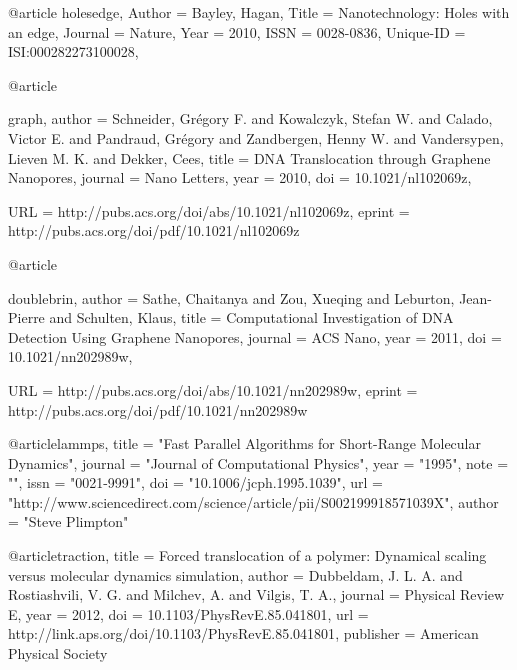 @article{ holesedge,
Author = {Bayley, Hagan},
Title = {{Nanotechnology: Holes with an edge}},
Journal = {{Nature}},
Year = {{2010}},
ISSN = {{0028-0836}},
Unique-ID = {{ISI:000282273100028}},
}

@article{graph,
author = {Schneider, Grégory F. and Kowalczyk, Stefan W. and Calado, Victor E. and Pandraud, Grégory and Zandbergen, Henny W. and Vandersypen, Lieven M. K. and Dekker, Cees},
title = {DNA Translocation through Graphene Nanopores},
journal = {Nano Letters},
year = {2010},
doi = {10.1021/nl102069z},

URL = {http://pubs.acs.org/doi/abs/10.1021/nl102069z},
eprint = {http://pubs.acs.org/doi/pdf/10.1021/nl102069z}
}

@article{doublebrin,
author = {Sathe, Chaitanya and Zou, Xueqing and Leburton, Jean-Pierre and Schulten, Klaus},
title = {Computational Investigation of DNA Detection Using Graphene Nanopores},
journal = {ACS Nano},
year = {2011},
doi = {10.1021/nn202989w},

URL = {http://pubs.acs.org/doi/abs/10.1021/nn202989w},
eprint = {http://pubs.acs.org/doi/pdf/10.1021/nn202989w}
}

@article{lammps,
title = "Fast Parallel Algorithms for Short-Range Molecular Dynamics",
journal = "Journal of Computational Physics",
year = "1995",
note = "",
issn = "0021-9991",
doi = "10.1006/jcph.1995.1039",
url = "http://www.sciencedirect.com/science/article/pii/S002199918571039X",
author = "Steve Plimpton"
}

@article{traction,
  title = {Forced translocation of a polymer: Dynamical scaling versus molecular dynamics simulation},
  author = {Dubbeldam, J. L. A. and Rostiashvili, V. G. and Milchev, A. and Vilgis, T. A.},
  journal = {Physical Review E},
  year = {2012},
  doi = {10.1103/PhysRevE.85.041801},
  url = {http://link.aps.org/doi/10.1103/PhysRevE.85.041801},
  publisher = {American Physical Society}
}


